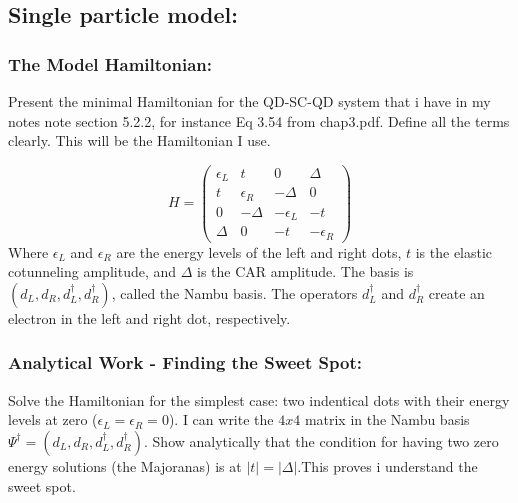 \documentclass[11pt, letterpaper, titlepage]{article}
\begin{document}
\subsection{Single particle model:}
\subsubsection{The Model Hamiltonian:} Present the minimal Hamiltonian for the QD-SC-QD system that i have in my notes note section 5.2.2, for instance Eq 3.54 from chap3.pdf. Define all the terms clearly. This will be the Hamiltonian I use.\par
$$  
  H = \begin{pmatrix}
    ϵ_L & t & 0 & Δ \\
    t & ϵ_R & -Δ & 0 \\
    0 & -Δ & -ϵ_L & -t \\
    Δ & 0 & -t & -ϵ_R
  \end{pmatrix}
$$
Where $ϵ_L$ and $ϵ_R$ are the energy levels of the left and right dots, $t$ is the elastic cotunneling amplitude, and $Δ$ is the CAR amplitude. The basis is $(d_L, d_R, d_L^{†}, d_R^{†})$, called the Nambu basis. The operators $d_L^{†}$ and $d_R^{†}$ create an electron in the left and right dot, respectively.\par

\subsubsection{Analytical Work - Finding the Sweet Spot:} Solve the Hamiltonian for the simplest case: two indentical dots with their energy levels at zero ($ϵ_L = ϵ_R = 0$). I can write the $4x4$ matrix in the Nambu basis $Ψ^{†}= (d_L, d_R, d_L^{†}, d_R^{†})$. Show analytically that the condition for having two zero energy solutions (the Majoranas) is at $|t| = |Δ|$.This proves i understand the sweet spot.\par
\end{document}
